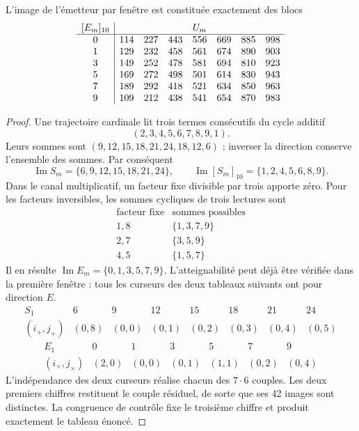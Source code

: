 \begin{proposition}
L'image de l'émetteur par fenêtre est constituée exactement des blocs
\[
\begin{array}{c|rrrrrrr}
[E_m]_{10}&\multicolumn{7}{c}{U_m}\\ \hline
0&114&227&443&556&669&885&998\\
1&129&232&458&561&674&890&903\\
3&149&252&478&581&694&810&923\\
5&169&272&498&501&614&830&943\\
7&189&292&418&521&634&850&963\\
9&109&212&438&541&654&870&983
\end{array}
\]
\end{proposition}
\begin{proof}
Une trajectoire cardinale lit trois termes consécutifs du cycle additif
\[
 (2,3,4,5,6,7,8,9,1).
\]
Leurs sommes sont
$(9,12,15,18,21,24,18,12,6)$ ; inverser la direction conserve l'ensemble
des sommes. Par conséquent
\[
 \operatorname{Im}S_m=\{6,9,12,15,18,21,24\},\qquad
 \operatorname{Im}[S_m]_{10}=\{1,2,4,5,6,8,9\}.
\]
Dans le canal multiplicatif, un facteur fixe divisible par trois apporte zéro. Pour les facteurs inversibles, les sommes cycliques de trois lectures sont
\[
\begin{array}{c|c}
\text{facteur fixe}&\text{sommes possibles}\\\hline
1,8&\{1,3,7,9\}\\
2,7&\{3,5,9\}\\
4,5&\{1,5,7\}
\end{array}
\]
Il en résulte $\operatorname{Im}E_m=\{0,1,3,5,7,9\}$.
L'atteignabilité peut déjà être vérifiée dans la première fenêtre : tous les
curseurs des deux tableaux suivants ont pour direction $E$.
\[
\begin{array}{c|rrrrrrr}
S_1&6&9&12&15&18&21&24\\\hline
(i_+,j_+)&(0,8)&(0,0)&(0,1)&(0,2)&(0,3)&(0,4)&(0,5)
\end{array}
\]
\[
\begin{array}{c|rrrrrr}
E_1&0&1&3&5&7&9\\\hline
(i_\times,j_\times)&(2,0)&(0,0)&(0,1)&(1,1)&(0,2)&(0,4)
\end{array}
\]
L'indépendance des deux curseurs réalise chacun des $7\cdot6$
couples. Les deux premiers chiffres restituent le couple résiduel, de sorte que ses
42 images sont distinctes. La congruence de contrôle fixe le troisième chiffre
et produit exactement le tableau énoncé.
\end{proof}


